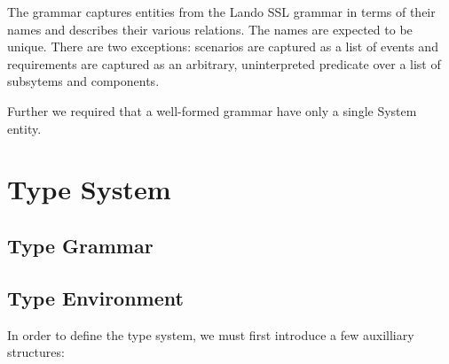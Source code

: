 \documentclass{article}
\begin{document}
The grammar captures entities from the Lando SSL grammar in terms of their names and describes their various relations. The names are expected to be unique. There are two exceptions: scenarios are captured as a list of events and requirements are captured as an arbitrary, uninterpreted predicate over a list of subsytems and components.

Further we required that a well-formed grammar have only a single System entity.

\section{Type System}

\subsection{Type Grammar}

\begin{grammar}
\end{grammar}

\subsection{Type Environment}

In order to define the type system, we must first introduce a few
auxilliary structures:
\end{document}

